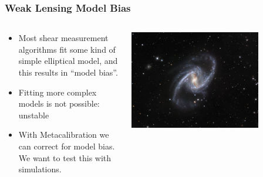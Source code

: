\documentclass{beamer}
\begin{document}
\frame
{
    \frametitle{Weak Lensing Model Bias}

 
    \begin{columns}
        \begin{column}{0.5\textwidth}    


            \begin{itemize}

                \item Most shear measurement algorithms fit
                    some kind of simple elliptical model, and this
                    results in ``model bias''.

                \item Fitting more complex models is not possible: unstable

                \item With Metacalibration we can correct for
                    model bias.  We want to test this with
                    simulations.

            \end{itemize}
        \end{column}

        \begin{column}{0.5\textwidth}
            \begin{center}
                \includegraphics[width=0.75\textwidth]{NGC-1365-Great-Barred-Spiral-Galaxy.jpg}
                \newline
            \end{center}
        \end{column}

    \end{columns}

}
\end{document}
